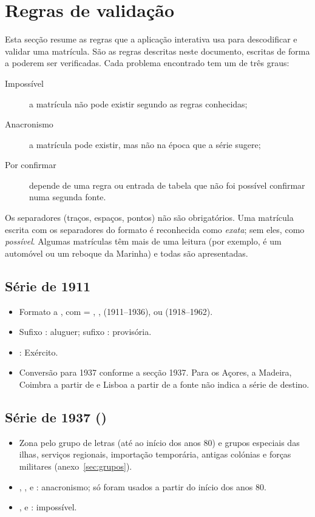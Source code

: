 \section{Regras de validação}\label{sec:regras}

Esta secção resume as regras que a aplicação interativa usa para descodificar e
validar uma matrícula. São as regras descritas neste documento, escritas de forma
a poderem ser verificadas. Cada problema encontrado tem um de três graus:

\begin{description}
  \item[Impossível] a matrícula não pode existir segundo as regras conhecidas;
  \item[Anacronismo] a matrícula pode existir, mas não na época que a série sugere;
  \item[Por confirmar] depende de uma regra ou entrada de tabela que não foi
        possível confirmar numa segunda fonte.
\end{description}

Os separadores (traços, espaços, pontos) não são obrigatórios. Uma matrícula
escrita com os separadores do formato é reconhecida como \emph{exata}; sem eles,
como \emph{possível}. Algumas matrículas têm mais de uma leitura (por exemplo,
 é um automóvel ou um reboque da Marinha) e todas são apresentadas.

\subsection{Série de 1911}
\begin{itemize}
  \item Formato  a , com  = , ,
         (1911–1936),  ou  (1918–1962).
  \item Sufixo : aluguer; sufixo : provisória.
  \item {}: Exército.
  \item Conversão para 1937 conforme a secção 1937. Para os Açores, a Madeira,
        Coimbra a partir de  e Lisboa a partir de  a
        fonte não indica a série de destino.
\end{itemize}

\subsection{Série de 1937 ()}
\begin{itemize}
  \item Zona pelo grupo de letras (até ao início dos anos 80) e grupos especiais
        das ilhas, serviços regionais, importação temporária, antigas colónias e
        forças militares (anexo~\ref{sec:grupos}).
  \item {}, ,  e : anacronismo; só foram
        usados a partir do início dos anos 80.
  \item {},  e : impossível.
\end{itemize}

